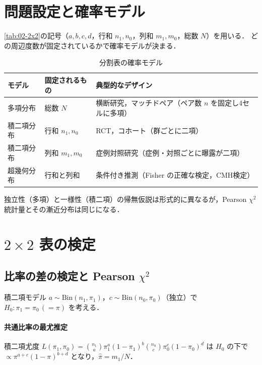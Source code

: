 \documentclass[a4paper,11pt,openany]{ltjsbook}
\newcommand{\Bin}{\mathrm{Bin}}
\begin{document}
\section{問題設定と確率モデル}\label{sec:04-model}
\cref{tab:02-2x2}の記号（$a,b,c,d$，行和 $n_1,n_0$，列和 $m_1,m_0$，総数 $N$）を用いる．
どの周辺度数が固定されているかで確率モデルが決まる．
\begin{table}[htbp]
\centering\small
\caption{分割表の確率モデル}\label{tab:04-models}
\begin{tabular}{@{}lL{42mm}L{65mm}@{}}
\toprule
モデル & 固定されるもの & 典型的なデザイン\\
\midrule
多項分布 & 総数 $N$ & 横断研究，マッチドペア（ペア数 $n$ を固定し4セルに多項）\\
積二項分布 & 行和 $n_1,n_0$ & RCT，コホート（群ごとに二項）\\
積二項分布 & 列和 $m_1,m_0$ & 症例対照研究（症例・対照ごとに曝露が二項）\\
超幾何分布 & 行和と列和 & 条件付き推測（Fisher の正確な検定，CMH検定）\\
\bottomrule
\end{tabular}
\end{table}
独立性（多項）と一様性（積二項）の帰無仮説は形式的に異なるが，Pearson $\chi^2$ 統計量とその漸近分布は同じになる．

\section{\texorpdfstring{$2\times2$}{2×2} 表の検定}\label{sec:04-2x2test}
\subsection{比率の差の検定と Pearson \texorpdfstring{$\chi^2$}{χ²}}\label{subsec:04-pearson}
積二項モデル $a\sim\Bin(n_1,\pi_1)$，$c\sim\Bin(n_0,\pi_0)$（独立）で $H_0:\pi_1=\pi_0\,(=\pi)$ を考える．
\paragraph{共通比率の最尤推定}
積二項尤度 $L(\pi_1,\pi_0)=\binom{n_1}{a}\pi_1^a(1-\pi_1)^{b}\binom{n_0}{c}\pi_0^c(1-\pi_0)^d$ は $H_0$ の下で
$\propto\pi^{a+c}(1-\pi)^{b+d}$ となり，$\hat\pi=m_1/N$．
\end{document}

